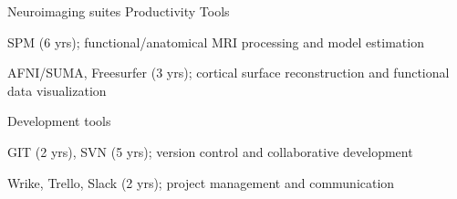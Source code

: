 \begin{cventries}
\cventry
    {Neuroimaging suites} %
    {Productivity Tools} %
    {\vspace*{-0.05cm}}
    {\vspace*{-0.05cm}} %
    {
      \begin{cvitems} %
        \item {SPM (6 yrs); functional/anatomical MRI processing and model estimation}
        \item {AFNI/SUMA, Freesurfer (3 yrs); cortical surface reconstruction and functional data visualization}
      \end{cvitems}
    }
    \vspace*{-0.2cm}
\cventry
	{Development tools}
	{\vspace*{-0.05cm}}
    {\vspace*{-0.05cm}}
    {\vspace*{-0.05cm}} %
    {
      \begin{cvitems} %
      	\item {GIT (2 yrs), SVN (5 yrs); version control and collaborative development}
      	\item {Wrike, Trello, Slack (2 yrs); project management and communication}
      \end{cvitems}
    }
    \vspace*{-0.2cm}
\end{cventries}
